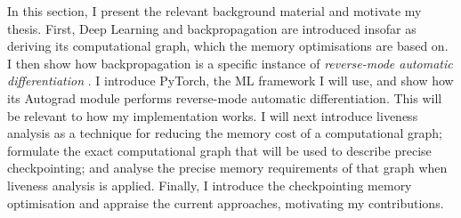In this section, I present the relevant background material and motivate my thesis. First, Deep Learning and backpropagation are introduced insofar as deriving its computational graph, which the memory optimisations are based on. I then show how backpropagation is a specific instance of \textit{reverse-mode automatic differentiation} \cite{Baydin2015}. I introduce PyTorch, the ML framework I will use, and show how its Autograd module performs reverse-mode automatic differentiation. This will be relevant to how my implementation works. 
I will next introduce liveness analysis as a technique for reducing the memory cost of a computational graph; formulate the exact computational graph that will be used to describe precise checkpointing; and analyse the precise memory requirements of that graph when liveness analysis is applied.
Finally, I introduce the checkpointing memory optimisation and appraise the current approaches, motivating my contributions.
